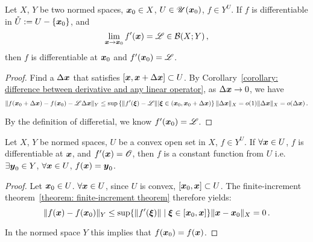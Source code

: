 \documentclass[openany]{book}
\begin{document}
\begin{theorem}
	Let $X$, $Y$ be two normed spaces, $\boldsymbol{x}_0 \in X$, $U \in \mathscr U(\boldsymbol{x}_0)$, $f \in Y^U$.
	If $f$ is differentiable in $\mathring U := U - \{\boldsymbol{x}_0\}$, and
	\begin{equation*}
		\lim_{\boldsymbol{x} \to \boldsymbol{x}_0} f'(\boldsymbol{x}) = \mathscr L \in \mathcal B(X; Y)\,,
	\end{equation*}
	then $f$ is differentiable at $\boldsymbol{x}_0$ and $f'(\boldsymbol{x}_0) = \mathscr L$. 
\end{theorem}
\begin{proof}
	Find a $\Delta \boldsymbol{x}$ that satisfies $[\boldsymbol{x}, \boldsymbol{x} + \Delta \boldsymbol{x}] \subset U$.
	By Corollary~\ref{corollary: difference between derivative and any linear operator}, 
	as $\Delta \boldsymbol{x} \to 0$, we have
	\begin{equation*}
		\|f(\boldsymbol{x}_0 + \Delta \boldsymbol{x}) - f(\boldsymbol{x}_0) - \mathscr L \Delta \boldsymbol{x}\|_Y
			\leq \sup\left\{ 
				\|f'(\boldsymbol{\xi}) - \mathscr L\| 
			\middle|
				\boldsymbol{\xi} \in (\boldsymbol{x}_0, \boldsymbol{x}_0 + \Delta \boldsymbol{x})
			 \right\} \|\Delta \boldsymbol{x}\|_X
			 = o(1) \|\Delta \boldsymbol{x}\|_X
			 = o(\Delta \boldsymbol{x})\,.
	\end{equation*}
	
	By the definition of differetial, we know $f'(\boldsymbol{x}_0) = \mathscr L$.
\end{proof}

\begin{theorem}
	Let $X$, $Y$ be normed spaces, $U$ be a convex open set in $X$, $f \in Y^U$.
	If $\forall \boldsymbol{x} \in U$, $f$ is differentiable at $\boldsymbol{x}$, and $f'(\boldsymbol{x}) = \mathscr O$, 
	then $f$ is a constant function from $U$ 
		i.e.\ $\exists \boldsymbol{y}_0 \in Y$, $\forall \boldsymbol{x} \in U$, $f(\boldsymbol{x}) = \boldsymbol{y}_0$.
\end{theorem}
\begin{proof}
	Let $\boldsymbol{x}_0 \in U$. $\forall \boldsymbol{x} \in U$, since $U$ is convex, $[\boldsymbol{x}_0, \boldsymbol{x}] \subset U$.
	The finite-increment theorem~\ref{theorem: finite-increment theorem} therefore yields:
	\begin{equation*}
		\|f(\boldsymbol{x}) - f(\boldsymbol{x}_0)\|_Y 
			\leq \sup \{ \|f'(\boldsymbol{\xi})\| \mid \boldsymbol{\xi} \in [\boldsymbol{x}_0, \boldsymbol{x}]\} \|\boldsymbol{x} - \boldsymbol{x}_0\|_X
			= 0\,.
		\end{equation*} 

	In the normed space $Y$ this implies that $f(\boldsymbol{x}_0) = f(\boldsymbol{x})$.
\end{proof}
\end{document}
